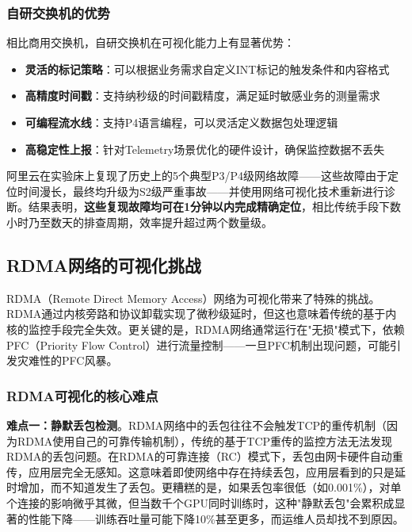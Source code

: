 \subsubsection{自研交换机的优势}

相比商用交换机，自研交换机在可视化能力上有显著优势：

\begin{itemize}
    \item \textbf{灵活的标记策略}：可以根据业务需求自定义INT标记的触发条件和内容格式
    \item \textbf{高精度时间戳}：支持纳秒级的时间戳精度，满足延时敏感业务的测量需求
    \item \textbf{可编程流水线}：支持P4语言编程，可以灵活定义数据包处理逻辑
    \item \textbf{高稳定性上报}：针对Telemetry场景优化的硬件设计，确保监控数据不丢失
\end{itemize}

阿里云在实验床上复现了历史上的5个典型P3/P4级网络故障——这些故障由于定位时间漫长，最终均升级为S2级严重事故——并使用网络可视化技术重新进行诊断。结果表明，\textbf{这些复现故障均可在1分钟以内完成精确定位}，相比传统手段下数小时乃至数天的排查周期，效率提升超过两个数量级。

\subsection{RDMA网络的可视化挑战}

RDMA（Remote Direct Memory Access）网络为可视化带来了特殊的挑战。RDMA通过内核旁路和协议卸载实现了微秒级延时，但这也意味着传统的基于内核的监控手段完全失效。更关键的是，RDMA网络通常运行在"无损"模式下，依赖PFC（Priority Flow Control）进行流量控制——一旦PFC机制出现问题，可能引发灾难性的PFC风暴。

\subsubsection{RDMA可视化的核心难点}

\textbf{难点一：静默丢包检测}。RDMA网络中的丢包往往不会触发TCP的重传机制（因为RDMA使用自己的可靠传输机制），传统的基于TCP重传的监控方法无法发现RDMA的丢包问题。在RDMA的可靠连接（RC）模式下，丢包由网卡硬件自动重传，应用层完全无感知。这意味着即使网络中存在持续丢包，应用层看到的只是延时增加，而不知道发生了丢包。更糟糕的是，如果丢包率很低（如0.001\%），对单个连接的影响微乎其微，但当数千个GPU同时训练时，这种"静默丢包"会累积成显著的性能下降——训练吞吐量可能下降10\%甚至更多，而运维人员却找不到原因。

